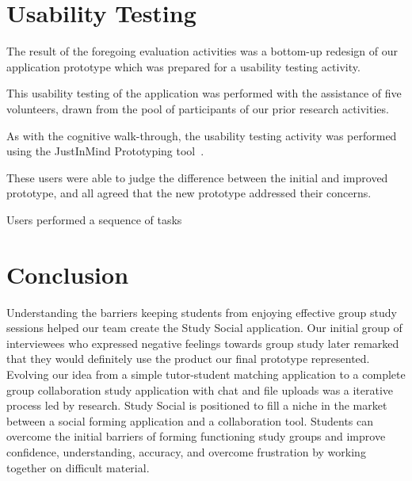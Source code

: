 \documentclass{sigchi-ext}
\begin{document}
\section{Usability Testing}

The result of the foregoing evaluation activities was a bottom-up redesign of
our application prototype which was prepared for a usability testing activity.

This usability testing of the application was performed with the assistance of
five volunteers, drawn from the pool of participants of our prior research activities.

As with the cognitive walk-through, the usability testing activity was
performed using the JustInMind Prototyping tool~\cite{justinmind}. 

These users were able to judge the difference between the initial and
improved prototype, and all agreed that the new prototype addressed their
concerns.

Users performed a sequence of tasks




\section{Conclusion}

Understanding the barriers keeping students from enjoying effective group study
sessions helped our team create the Study Social application. Our initial group of
interviewees who expressed negative feelings towards group study later remarked
that they would definitely use the product our final prototype represented.
Evolving our idea from a simple tutor-student matching application to a
complete group collaboration study application with chat and file uploads was a
iterative process led by research.  Study Social is positioned to fill a niche
in the market between a social forming application and a collaboration tool.
Students can overcome the initial barriers of forming functioning study groups
and improve confidence, understanding, accuracy, and overcome frustration by
working together on difficult material.        
\end{document}
